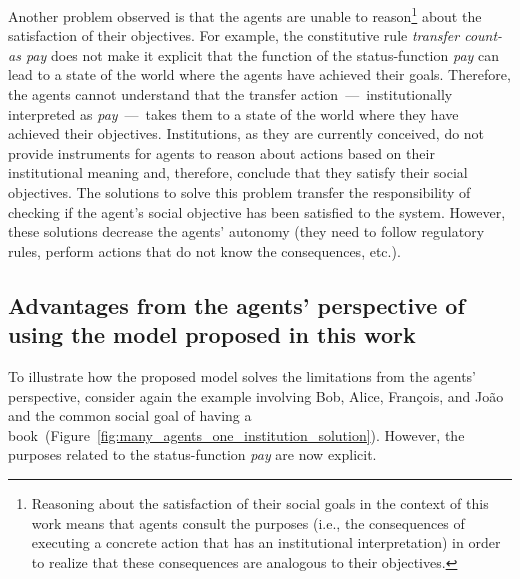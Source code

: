 \documentclass[runningheads]{llncs}
\begin{document}
Another problem observed is that the agents are unable to reason\footnote{Reasoning about the satisfaction of their social goals in the context of this work means that agents consult the purposes (i.e., the consequences of executing a concrete action that has an institutional interpretation) in order to realize that these consequences are analogous to their objectives.} about the satisfaction of their objectives.
For example, the constitutive rule \emph{transfer count-as pay} does not make it explicit that the function of the status-function \emph{pay} can lead to a state of the world where the agents have achieved their goals. Therefore, the agents cannot understand that the transfer action~---~institutionally interpreted as \emph{pay}~---~takes them to a state of the world where they have achieved their objectives.
Institutions, as they are currently conceived, do not provide instruments for agents to reason about actions based on their institutional meaning and, therefore, conclude that they satisfy their social objectives.
The solutions to solve this problem transfer the responsibility of checking if the agent's social objective has been satisfied to the system. However, these solutions decrease the agents' autonomy (they need to follow regulatory rules, perform actions that do not know the consequences, etc.).




\subsection{Advantages from the agents' perspective of using the model proposed in this work}
\label{agents_model}

To illustrate how the proposed model solves the limitations from the agents' perspective, consider again the example involving Bob, Alice, François, and João and the common social goal of having a book~(Figure~\ref{fig:many_agents_one_institution_solution}). 
However, the purposes related to the status-function \emph{pay} are now explicit.
\end{document}

